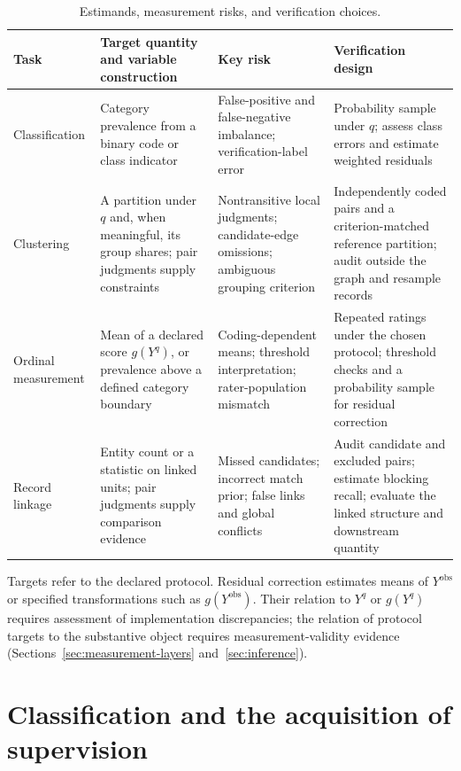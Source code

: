 \documentclass[11pt,a4paper]{article}
\begin{document}
\begin{table}[H]
\centering\small
\caption{Estimands, measurement risks, and verification choices.}\label{tab:roles}
\begin{tabularx}{\textwidth}{@{}L{2.15cm}YL{3.7cm}Y@{}}
\toprule
Task & Target quantity and variable construction & Key risk & Verification design \\
\midrule
Classification & Category prevalence from a binary code or class indicator & False-positive and false-negative imbalance; verification-label error & Probability sample under $q$; assess class errors and estimate weighted residuals \\
Clustering & A partition under $q$ and, when meaningful, its group shares; pair judgments supply constraints & Nontransitive local judgments; candidate-edge omissions; ambiguous grouping criterion & Independently coded pairs and a criterion-matched reference partition; audit outside the graph and resample records \\
Ordinal measurement & Mean of a declared score $g(Y^q)$, or prevalence above a defined category boundary & Coding-dependent means; threshold interpretation; rater-population mismatch & Repeated ratings under the chosen protocol; threshold checks and a probability sample for residual correction \\
Record linkage & Entity count or a statistic on linked units; pair judgments supply comparison evidence & Missed candidates; incorrect match prior; false links and global conflicts & Audit candidate and excluded pairs; estimate blocking recall; evaluate the linked structure and downstream quantity \\
\bottomrule
\end{tabularx}
\vspace{0.3em}
\parbox{\textwidth}{\footnotesize Targets refer to the declared protocol. Residual correction estimates means of $Y^{\mathrm{obs}}$ or specified transformations such as $g(Y^{\mathrm{obs}})$. Their relation to $Y^q$ or $g(Y^q)$ requires assessment of implementation discrepancies; the relation of protocol targets to the substantive object requires measurement-validity evidence (Sections~\ref{sec:measurement-layers} and~\ref{sec:inference}).}
\end{table}

\section{Classification and the acquisition of supervision}\label{sec:classification}
\end{document}
